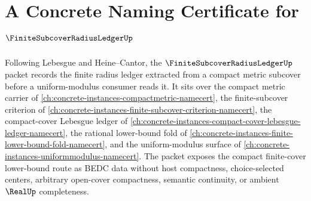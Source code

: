 \chapter{A Concrete Naming Certificate for $\FiniteSubcoverRadiusLedgerUp$}
\label{ch:concrete-instances-finite-subcover-radius-ledger-namecert}

Following Lebesgue and Heine--Cantor, the $\FiniteSubcoverRadiusLedgerUp$ packet records the finite radius ledger extracted from a compact metric subcover before a uniform-modulus consumer reads it. It sits over the compact metric carrier of \autoref{ch:concrete-instances-compactmetric-namecert}, the finite-subcover criterion of \autoref{ch:concrete-instances-finite-subcover-criterion-namecert}, the compact-cover Lebesgue ledger of \autoref{ch:concrete-instances-compact-cover-lebesgue-ledger-namecert}, the rational lower-bound fold of \autoref{ch:concrete-instances-finite-lower-bound-fold-namecert}, and the uniform-modulus surface of \autoref{ch:concrete-instances-uniformmodulus-namecert}. The packet exposes the compact finite-cover lower-bound route as BEDC data without host compactness, choice-selected centers, arbitrary open-cover compactness, semantic continuity, or ambient $\RealUp$ completeness.

